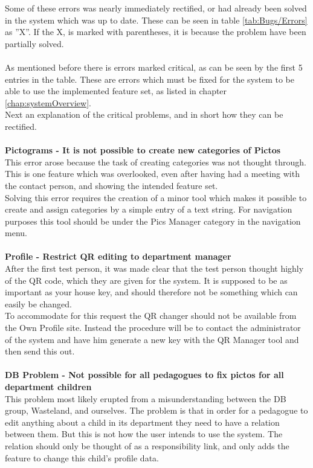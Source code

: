 Some of these errors was nearly immediately rectified, or had already been solved in the system which was up to date. These can be seen in table \ref{tab:Bugs/Errors} as ''X''. If the X, is marked with parentheses, it is because the problem have been partially solved.\\
\\
As mentioned before there is errors marked critical, as can be seen by the first 5 entries in the table. These are errors which must be fixed for the system to be able to use the implemented feature set, as listed in chapter \vref{chap:systemOverview}.\\
Next an explanation of the critical problems, and in short how they can be rectified.\\
\\
\textbf{Pictograms - It is not possible to create new categories of Pictos}\\
This error arose because the task of creating categories was not thought through. This is one feature which was overlooked, even after having had a meeting with the contact person, and showing the intended feature set.\\
Solving this error requires the creation of a minor tool which makes it possible to create and assign categories by a simple entry of a text string. For navigation purposes this tool should be under the Pics Manager category in the navigation menu.\\
\\
\textbf{Profile - Restrict QR editing to department manager}\\
After the first test person, it was made clear that the test person thought highly of the QR code, which they are given for the system. It is supposed to be as important as your house key, and should therefore not be something which can easily be changed.\\
To accommodate for this request the QR changer should not be available from the Own Profile site. Instead the procedure will be to contact the administrator of the system and have him generate a new key with the QR Manager tool and then send this out.\\
\\
\textbf{DB Problem - Not possible for all pedagogues to fix pictos for all department children}\\
This problem most likely erupted from a misunderstanding between the DB group, Wasteland, and ourselves. The problem is that in order for a pedagogue to edit anything about a child in its department they need to have a relation between them. But this is not how the user intends to use the system. The relation should only be thought of as a responsibility link, and only adds the feature to change this child's profile data.\\
